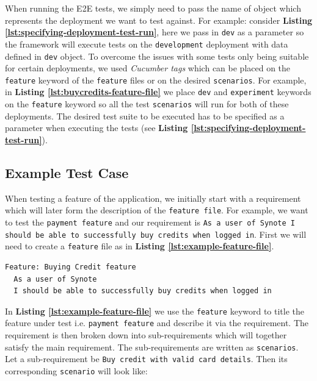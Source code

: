 When running the E2E tests, we simply need to pass the name of object which represents the deployment we want to test against. For example: consider \textbf{Listing \ref{lst:specifying-deployment-test-run}}, here we pass in \texttt{dev} as a parameter so the framework will execute tests on the \texttt{development} deployment with data defined in \texttt{dev} object.  To overcome the issues with some tests only being suitable for certain deployments, we used \textit{Cucumber tags} which can be placed on the \texttt{feature} keyword of the \texttt{feature} files or on the desired \texttt{scenarios}. For example, in \textbf{Listing \ref{lst:buycredits-feature-file}} we place \texttt{dev} and \texttt{experiment} keywords on the \texttt{feature} keyword so all the test \texttt{scenarios} will run for both of these deployments. The desired test suite to be executed has to be specified as a parameter when executing the tests (see \textbf{Listing \ref{lst:specifying-deployment-test-run}}).

\subsection{Example Test Case}
\label{subsec:example-test-case}

When testing a feature of the application, we initially start with a requirement which will later form the description of the \texttt{feature file}. For example, we want to test the \texttt{payment feature} and our requirement is \texttt{As a user of Synote I should be able to successfully buy credits when logged in}. First we will need to create a \texttt{feature} file as in \textbf{Listing \ref{lst:example-feature-file}}.

\begin{listing}[H]
\begin{verbatim}
Feature: Buying Credit feature
  As a user of Synote
  I should be able to successfully buy credits when logged in
\end{verbatim}
\label{lst:example-feature-file}
\end{listing}

In \textbf{Listing \ref{lst:example-feature-file}} we use the \texttt{feature} keyword to title the feature under test i.e. \texttt{payment feature} and describe it via the requirement. The requirement is then broken down into sub-requirements which will together satisfy the main requirement. The sub-requirements are written as \texttt{scenarios}. Let a sub-requirement be \texttt{Buy credit with valid card details}. Then its corresponding \texttt{scenario} will look like:

